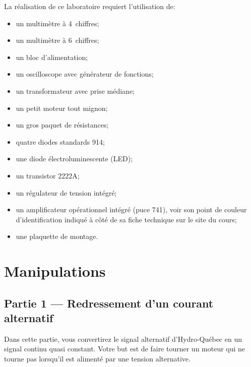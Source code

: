 \documentclass[canadien,12pt,oneside,letterpaper]{article}
\begin{document}
\noindent La réalisation de ce laboratoire requiert l'utilisation de:
\vspace{1ex}
\begin{itemize}
\item un multimètre à 4\textonehalf~chiffres;
\item un multimètre à 6\textonehalf~chiffres;
\item un bloc d'alimentation;
\item un oscilloscope avec générateur de fonctions;
\item un transformateur avec prise médiane;
\item un petit moteur tout mignon;
\item un gros paquet de résistances; %
\item quatre diodes standards 914;
\item une diode électroluminescente (LED);
\item un transistor 2222A;
\item un régulateur de tension intégré;
\item un amplificateur opérationnel intégré (puce 741), voir son point de couleur d'identification indiqué à côté de sa fiche technique sur le site du cours;
\item une plaquette de montage.
\end{itemize}


\section{Manipulations}

\setlength{\parskip}{1ex plus 0.5ex minus 0.2ex}

\subsection{Partie 1 --- Redressement d'un courant alternatif}

Dans cette partie, vous convertirez le signal alternatif d'Hydro-Québec en un signal continu quasi constant. Votre but est de faire tourner un moteur qui ne tourne pas lorsqu'il est alimenté par une tension alternative.
\end{document}
